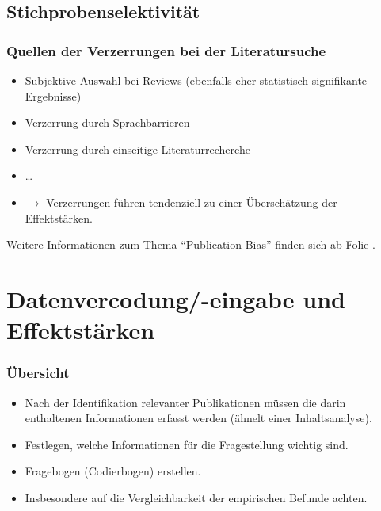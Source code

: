 \subsection{Stichprobenselektivität}

\begin{frame}
  \frametitle{Quellen der Verzerrungen bei der Literatursuche}
  \begin{itemize}[<+->]
  \item Subjektive Auswahl bei Reviews (ebenfalls eher statistisch signifikante Ergebnisse)
  \item Verzerrung durch Sprachbarrieren
  \item Verzerrung durch einseitige Literaturrecherche
  \item \ldots
  \item $\rightarrow$ Verzerrungen führen tendenziell zu einer Überschätzung der Effektstärken.
  \end{itemize}

  Weitere Informationen zum Thema "`Publication Bias"' finden sich ab Folie \pageref{sec:pubbias}.

\end{frame}

\section{Datenvercodung/-eingabe und Effektstärken}


\begin{frame}
  \frametitle{Übersicht}
  \begin{itemize}[<+->]
  \item Nach der Identifikation relevanter Publikationen müssen die darin enthaltenen Informationen erfasst werden
    (ähnelt einer Inhaltsanalyse).
  \item Festlegen, welche Informationen für die Fragestellung wichtig sind.
  \item Fragebogen (Codierbogen) erstellen.
  \item Insbesondere auf die Vergleichbarkeit der empirischen Befunde achten.
  \end{itemize}
\end{frame}



